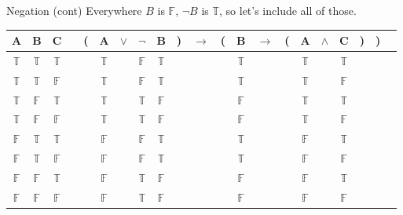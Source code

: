 \documentclass[
  ignorenonframetext,
]{beamer}
\renewcommand{\,}{\text{, }}
\def\True{\mathbb{T}}
\def\False{\mathbb{F}}
\begin{document}
\begin{frame}{Negation (cont)}
\protect\hypertarget{negation-cont}{}
Everywhere \(B\) is \(\False\), \(\neg B\) is \(\True\), so let's
include all of those.

\begin{center}
\begin{tabular}{@{ }c@{ }@{ }c@{ }@{ }c | c@{ }@{}c@{}@{ }c@{ }@{ }c@{ }@{ }c@{ }@{ }c@{ }@{}c@{}@{ }c@{ }@{}c@{}@{ }c@{ }@{ }c@{ }@{}c@{}@{ }c@{ }@{ }c@{ }@{ }c@{ }@{}c@{}@{}c@{}@{ }c}
A & B & C &  & ( & A & $\vee$ & $\neg$ & B & ) & $\rightarrow$ & ( & B & $\rightarrow$ & ( & A & $\wedge$ & C & ) & ) & \\
\hline 
 $\True$ & $\True$ & $\True$ &  &  & $\True$ && $\False$ & $\True$ &  &&  & $\True$ &&  & $\True$ && $\True$ &  &  & \\
 $\True$ & $\True$ & $\False$ &  &  & $\True$ && $\False$ & $\True$ &  &&  & $\True$ &&  & $\True$ && $\False$ &  &  & \\
 $\True$ & $\False$ & $\True$ &  &  & $\True$ && $\True$ & $\False$ &  &&  & $\False$ &&  & $\True$ && $\True$ &  &  & \\
 $\True$ & $\False$ & $\False$ &  &  & $\True$ && $\True$ & $\False$ &  &&  & $\False$ &&  & $\True$ && $\False$ &  &  & \\
 $\False$ & $\True$ & $\True$ &  &  & $\False$ && $\False$ & $\True$ &  &&  & $\True$ &&  & $\False$ && $\True$ &  &  & \\
 $\False$ & $\True$ & $\False$ &  &  & $\False$ && $\False$ & $\True$ &  &&  & $\True$ &&  & $\False$ && $\False$ &  &  & \\
 $\False$ & $\False$ & $\True$ &  &  & $\False$ && $\True$ & $\False$ &  &&  & $\False$ &&  & $\False$ && $\True$ &  &  & \\
 $\False$ & $\False$ & $\False$ &  &  & $\False$ && $\True$ & $\False$ &  &&  & $\False$ &&  & $\False$ && $\False$ &  &  & \\
\end{tabular}
\end{center}
\end{frame}
\end{document}
